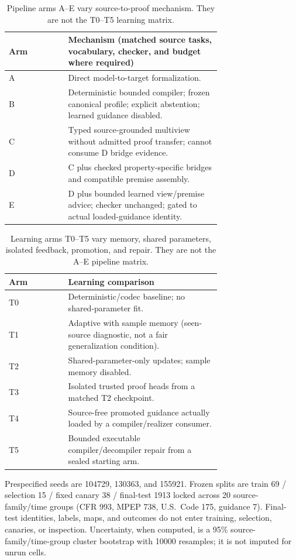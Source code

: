 \documentclass{article}
\begin{document}
\begin{table}[t]
\centering
\small
\caption{Pipeline arms A--E vary source-to-proof mechanism. They are not the T0--T5 learning matrix.}
\label{tab:arms-ae}
\begin{tabular}{lp{0.72\linewidth}}
\toprule
Arm & Mechanism (matched source tasks, vocabulary, checker, and budget where required) \\
\midrule
A & Direct model-to-target formalization. \\
B & Deterministic bounded compiler; frozen canonical profile; explicit abstention; learned guidance disabled. \\
C & Typed source-grounded multiview without admitted proof transfer; cannot consume D bridge evidence. \\
D & C plus checked property-specific bridges and compatible premise assembly. \\
E & D plus bounded learned view/premise advice; checker unchanged; gated to actual loaded-guidance identity. \\
\bottomrule
\end{tabular}
\end{table}

\begin{table}[t]
\centering
\small
\caption{Learning arms T0--T5 vary memory, shared parameters, isolated feedback, promotion, and repair. They are not the A--E pipeline matrix.}
\label{tab:arms-t}
\begin{tabular}{lp{0.72\linewidth}}
\toprule
Arm & Learning comparison \\
\midrule
T0 & Deterministic/codec baseline; no shared-parameter fit. \\
T1 & Adaptive with sample memory (seen-source diagnostic, not a fair generalization condition). \\
T2 & Shared-parameter-only updates; sample memory disabled. \\
T3 & Isolated trusted proof heads from a matched T2 checkpoint. \\
T4 & Source-free promoted guidance actually loaded by a compiler/realizer consumer. \\
T5 & Bounded executable compiler/decompiler repair from a sealed starting arm. \\
\bottomrule
\end{tabular}
\end{table}

Prespecified seeds are 104729, 130363, and 155921. Frozen splits are train 69 / selection 15 / fixed canary 38 / final-test 1913 locked across 20 source-family/time groups (CFR 993, MPEP 738, U.S.\ Code 175, guidance 7). Final-test identities, labels, maps, and outcomes do not enter training, selection, canaries, or inspection. Uncertainty, when computed, is a 95\% source-family/time-group cluster bootstrap with 10000 resamples; it is not imputed for unrun cells.
\end{document}
